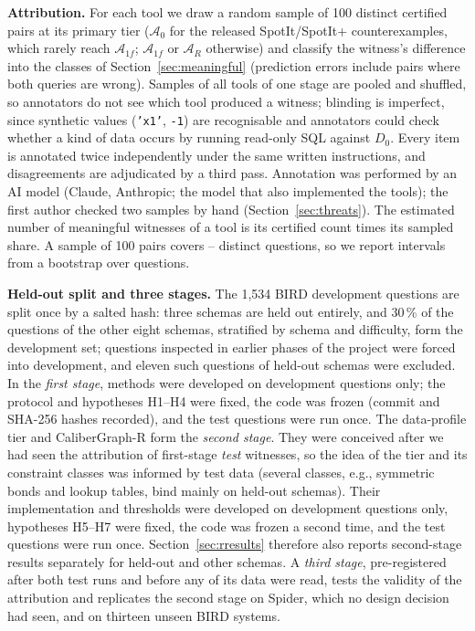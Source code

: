 \textbf{Attribution.}\label{sec:attribution} For each tool we draw a random sample of 100 distinct certified pairs at its primary tier ($\mathcal A_0$ for the released SpotIt/SpotIt+ counterexamples, which rarely reach $\mathcal A_{1f}$; $\mathcal A_{1f}$ or $\mathcal A_R$ otherwise) and classify the witness's difference into the classes of Section~\ref{sec:meaningful} (prediction errors include pairs where both queries are wrong). Samples of all tools of one stage are pooled and shuffled, so annotators do not see which tool produced a witness; blinding is imperfect, since synthetic values (\texttt{'x1'}, \texttt{-1}) are recognisable and annotators could check whether a kind of data occurs by running read-only SQL against $D_0$. Every item is annotated twice independently under the same written instructions, and disagreements are adjudicated by a third pass. Annotation was performed by an AI model (Claude, Anthropic; the model that also implemented the tools); the first author checked two samples by hand (Section~\ref{sec:threats}). The estimated number of meaningful witnesses of a tool is its certified count times its sampled share. A sample of 100 pairs covers -- distinct questions, so we report intervals from a bootstrap over questions.

\textbf{Held-out split and three stages.} The 1,534 BIRD development questions are split once by a salted hash: three schemas are held out entirely, and 30\,\% of the questions of the other eight schemas, stratified by schema and difficulty, form the development set; questions inspected in earlier phases of the project were forced into development, and eleven such questions of held-out schemas were excluded. In the \emph{first stage}, methods were developed on development questions only; the protocol and hypotheses H1--H4 were fixed, the code was frozen (commit and SHA-256 hashes recorded), and the test questions were run once. The data-profile tier and CaliberGraph-R form the \emph{second stage}. They were conceived after we had seen the attribution of first-stage \emph{test} witnesses, so the idea of the tier and its constraint classes was informed by test data (several classes, e.g., symmetric bonds and lookup tables, bind mainly on held-out schemas). Their implementation and thresholds were developed on development questions only, hypotheses H5--H7 were fixed, the code was frozen a second time, and the test questions were run once. Section~\ref{sec:rresults} therefore also reports second-stage results separately for held-out and other schemas. A \emph{third stage}, pre-registered after both test runs and before any of its data were read, tests the validity of the attribution and replicates the second stage on Spider, which no design decision had seen, and on thirteen unseen BIRD systems.

